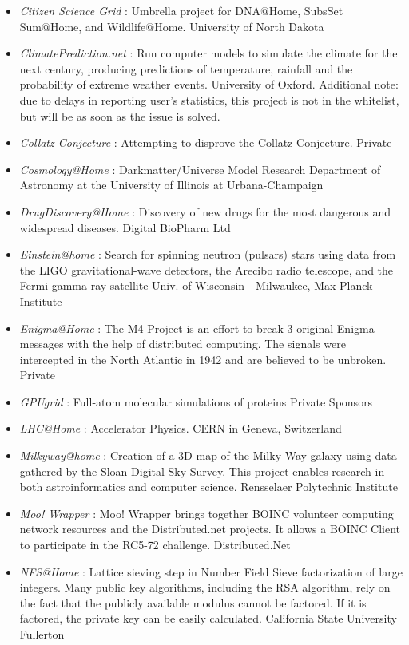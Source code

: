 \begin{itemize}
	\item {\em Citizen Science Grid} : Umbrella project for DNA@Home, SubsSet Sum@Home, and Wildlife@Home. University of North Dakota
	\item {\em ClimatePrediction.net} : Run computer models to simulate the climate for the next century, producing predictions of temperature, rainfall and the probability of extreme weather events. 	University of Oxford. Additional note: due to delays in reporting user's statistics, this project is not in the whitelist, but will be as soon as the issue is solved.
	\item {\em Collatz Conjecture} : Attempting to disprove the Collatz Conjecture.	Private		
	\item {\em Cosmology@Home} : Darkmatter/Universe Model Research	Department of Astronomy at the University of Illinois at Urbana-Champaign
	\item {\em DrugDiscovery@Home} : Discovery of new drugs for the most dangerous and widespread diseases.	Digital BioPharm Ltd
	\item {\em Einstein@home} : Search for spinning neutron (pulsars) stars using data from the LIGO gravitational-wave detectors, the Arecibo radio telescope, and the Fermi gamma-ray satellite	Univ. of Wisconsin - Milwaukee, Max Planck Institute
	\item {\em Enigma@Home} : The M4 Project is an effort to break 3 original Enigma messages with the help of distributed computing. The signals were intercepted in the North Atlantic in 1942 and are believed to be unbroken.	Private	
	\item {\em GPUgrid} : Full-atom molecular simulations of proteins	Private Sponsors
	\item {\em LHC@Home} : Accelerator Physics. CERN in Geneva, Switzerland
	\item {\em Milkyway@home} : Creation of a 3D map of the Milky Way galaxy using data gathered by the Sloan Digital Sky Survey. This project enables research in both astroinformatics and computer science.	Rensselaer Polytechnic Institute
	\item {\em Moo! Wrapper} : Moo! Wrapper brings together BOINC volunteer computing network resources and the Distributed.net projects. It allows a BOINC Client to participate in the RC5-72 challenge.	Distributed.Net	
	\item {\em NFS@Home} : Lattice sieving step in Number Field Sieve factorization of large integers. Many public key algorithms, including the RSA algorithm, rely on the fact that the publicly available modulus cannot be factored. If it is factored, the private key can be easily calculated.	California State University Fullerton	

\end{itemize}
